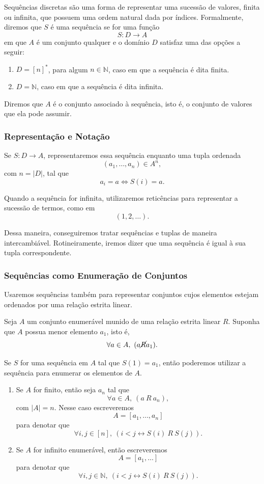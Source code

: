 Sequências discretas são uma forma de representar uma sucessão de valores,
finita ou infinita, que possuem uma ordem natural dada por índices.
Formalmente, diremos que $S$ é uma sequência se for uma função
\[
  S : D \to A
\]
em que $A$ é um conjunto qualquer e o domínio $D$ satisfaz uma das opções a
seguir:

\begin{enumerate}
  \item $D = [n]^*$, para algum $n \in \mathbb{N}$, caso em que a sequência é
  dita finita.

  \item $D = \mathbb{N}$, caso em que a sequência é dita infinita.
\end{enumerate}

Diremos que $A$ é o conjunto associado à sequência, isto é, o conjunto de
valores que ela pode assumir.

\subsubsection{Representação e Notação}

Se $S : D \to A$, representaremos essa sequência enquanto uma tupla ordenada
\[
  (a_1, \ldots, a_n) \in A^n,
\]
com $n = |D|$, tal que
\[
  a_i = a \Longleftrightarrow S(i) = a.
\]

Quando a sequência for infinita, utilizaremos reticências para representar
a sucessão de termos, como em
\[
  (1,2,\ldots).
\]

Dessa maneira, conseguiremos tratar sequências e tuplas de maneira
intercambiável. Rotineiramente, iremos dizer que uma sequência é igual à
sua tupla correspondente.

\subsubsection{Sequências como Enumeração de Conjuntos}

Usaremos sequências também para representar conjuntos cujos elementos estejam
ordenados por uma relação estrita linear.

Seja $A$ um conjunto enumerável munido de uma relação estrita linear $R$.
Suponha que $A$ possua menor elemento $a_1$, isto é,
\[
  \forall a \in A,\ ( a \cancel{R} a_1 ).
\]

Se $S$ for uma sequência em $A$ tal que $S(1)=a_1$, então poderemos utilizar
a sequência para enumerar os elementos de $A$.

\begin{enumerate}

\item Se $A$ for finito, então seja $a_n$ tal que
\[
  \forall a \in A,\ ( a\ R\ a_n ),
\]
com $|A| = n$. Nesse caso escreveremos
\[
  A = [a_1, \ldots, a_n]
\]
para denotar que
\[
  \forall i,j \in [n],\ (
    i < j \leftrightarrow S(i)\ R\ S(j)
  ).
\]

\item Se $A$ for infinito enumerável, então escreveremos
\[
  A = [a_1, \ldots]
\]
para denotar que
\[
  \forall i,j \in \mathbb{N},\ (
    i < j \leftrightarrow S(i)\ R\ S(j)
  ).
\]

\end{enumerate}

